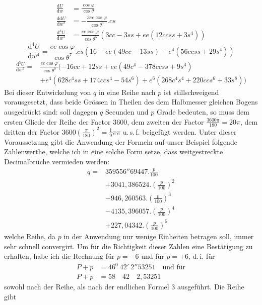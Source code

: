 \[
\begin{aligned}
\frac{\mathrm{d}U}{\mathrm{d}w}&=\frac{\cos\varphi}{\cos\theta}\\
\frac{\mathrm{dd}U}{\mathrm{d}w^2}&=-\frac{3ee\cos\varphi}{\cos\theta^3}\mathord{.}cs\\
\frac{\mathrm{d}^3U}{\mathrm{d}w^3}&=\frac{ee\cos\varphi}{\cos\theta^5}(3cc-3ss+ee(12ccss+3s^4))
\end{aligned}
\]
\[
\frac{\mathrm{d}^4U}{\mathrm{d}w^4}=\frac{ee\cos\varphi}{\cos\theta^7}\mathord{.}cs(16-ee(49cc-13ss)-e^4(56ccss+29s^4))
\]
\[
\begin{aligned}
\frac{\mathrm{d}^5U}{\mathrm{d}w^5}={}&\frac{ee\cos\varphi}{\cos\theta^9}(-16cc+12ss+ee(49c^4-378ccss+9s^4)\\
&+e^4(628c^4ss+174ccs^4-54s^6)+e^6(268c^4s^4+220ccs^6+33s^8))
\end{aligned}
\]
\indent Bei dieser Entwickelung von \(q\) in eine Reihe nach \(p\) ist stillschweigend vorausgesetzt, dass beide Grössen in Theilen des dem Halbmesser gleichen Bogens ausgedrückt sind: soll dagegen \(q\) Secunden und \(p\) Grade bedeuten, so muss dem ersten Gliede der Reihe der Factor \(3600\), dem zweiten der Factor \(\tfrac{3600\pi}{180}=20\pi\), dem dritten der Factor \(3600(\tfrac{\pi}{180})^2=\tfrac{1}{9}\pi\pi\) u.\,s.\,f. beigefügt werden. Unter dieser Voraussetzung gibt die Anwendung der Formeln auf unser Beispiel folgende Zahlenwerthe, welche ich in eine solche Form setze, dass weitgestreckte Decimalbrüche vermieden werden:
\[
\begin{aligned}
q={}&359556''69447\mathord{.}\frac{p}{100}\\
&+3041{,}386524\mathord{.}(\frac{p}{100})^2\\
&-946{,}260563\mathord{.}(\frac{p}{100})^3\\
&-4135{,}396057\mathord{.}(\frac{p}{100})^4\\
&+227{,}04342\mathord{.}(\frac{p}{100})^5
\end{aligned}
\]
welche Reihe, da \(p\) in der Anwendung nur wenige Einheiten betragen soll, immer sehr schnell convergirt. Um für die Richtigkeit dieser Zahlen eine Bestätigung zu erhalten, habe ich die Rechnung für \(p=-6\) und für \(p=+6\), d.\,i. für
\[
\begin{aligned}
P+p&=46^0\ 42'\ 2''53251\quad\text{und für}\\
P+p&=58\quad42\quad2{,}53251
\end{aligned}
\]
sowohl nach der Reihe, als nach der endlichen Formel 3 ausgeführt. Die Reihe gibt
